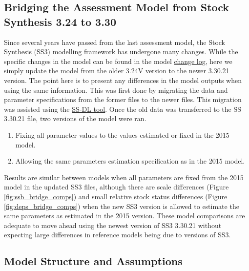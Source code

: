 \documentclass[11pt,
  english,
  letterpaper,
]{article}
\providecommand{\tightlist}{%
  \setlength{\itemsep}{0pt}\setlength{\parskip}{0pt}}
\providecommand{\tightlist}{%
  \setlength{\itemsep}{0pt}\setlength{\parskip}{0pt}}
\begin{document}
\hypertarget{bridging-the-assessment-model-from-stock-synthesis-3.24-to-3.30}{%
\subsection{Bridging the Assessment Model from Stock Synthesis 3.24 to 3.30}\label{bridging-the-assessment-model-from-stock-synthesis-3.24-to-3.30}}

Since several years have passed from the last assessment model, the Stock Synthesis (SS3) modelling framework has undergone many changes. While the specific changes in the model can be found in the model \href{https://github.com/nmfs-stock-synthesis/stock-synthesis/blob/v3.30.19/Change_log_for_SS_3.30.xlsx?raw=true}{change log}, here we simply update the model from the older 3.24V version to the newer 3.30.21 version. The point here is to present any differences in the model outputs when using the same information. This was first done by migrating the data and parameter specifications from the former files to the newer files. This migration was assisted using the \href{https://github.com/shcaba/SS-DL-tool}{SS-DL tool}. Once the old data was transferred to the SS 3.30.21 file, two versions of the model were ran.

\begin{enumerate}
\def\labelenumi{\arabic{enumi})}
\tightlist
\item
  Fixing all parameter values to the values estimated or fixed in the 2015 model.
\item
  Allowing the same parameters estimation specification as in the 2015 model.
\end{enumerate}

Results are similar between models when all parameters are fixed from the 2015 model in the updated SS3 files, although there are scale differences (Figure \ref{fig:ssb_bridge_comps}) and small relative stock status differences (Figure \ref{fig:deps_bridge_comps}) when the new SS3 version is allowed to estimate the same parameters as estimated in the 2015 version. These model comparisons are adequate to move ahead using the newest version of SS3 3.30.21 without expecting large differences in reference models being due to versions of SS3.

\hypertarget{model-structure-and-assumptions}{%
\subsection{Model Structure and Assumptions}\label{model-structure-and-assumptions}}
\end{document}
